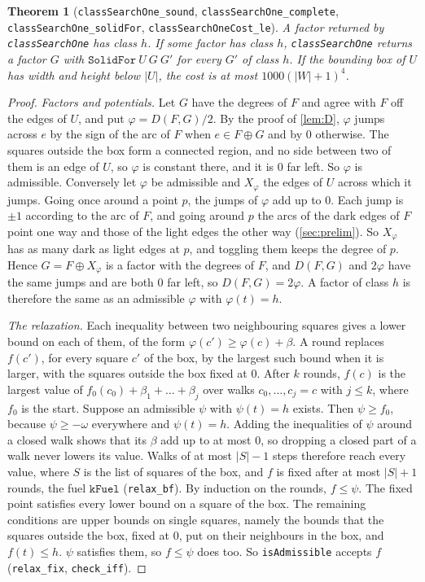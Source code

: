 \documentclass[11pt]{article}
\theoremstyle{plain}
\newtheorem{theorem}{Theorem}[section]
\theoremstyle{definition}
\theoremstyle{remark}
\newcommand{\lean}[1]{\texttt{#1}}
\begin{document}
\begin{theorem}[\lean{classSearchOne\_sound}, \lean{classSearchOne\_complete}, \lean{classSearchOne\_solidFor}, \lean{classSearchOneCost\_le}]
\label{thm:classsearch}
A factor returned by \lean{classSearchOne} has class $h$.
If some factor has class $h$, \lean{classSearchOne} returns a factor $G$ with $\lean{SolidFor}\ U\ G\ G'$ for
every $G'$ of class $h$.
If the bounding box of $U$ has width and height below $|U|$, the cost is at most
$1000(|W|+1)^4$.
\end{theorem}

\begin{proof}
\emph{Factors and potentials.}
Let $G$ have the degrees of $F$ and agree with $F$ off the edges of $U$, and put
$\varphi=D(F,G)/2$.
By the proof of \cref{lem:D}, $\varphi$ jumps across $e$ by the sign of the arc of $F$ when
$e\in F\oplus G$ and by $0$ otherwise.
The squares outside the box form a connected region, and no side between two of them is an edge of
$U$, so $\varphi$ is constant there, and it is $0$ far left.
So $\varphi$ is admissible.
Conversely let $\varphi$ be admissible and $X_\varphi$ the edges of $U$ across which it jumps.
Going once around a point $p$, the jumps of $\varphi$ add up to $0$.
Each jump is $\pm1$ according to the arc of $F$, and going around $p$ the arcs of the dark edges of
$F$ point one way and those of the light edges the other way (\cref{sec:prelim}).
So $X_\varphi$ has as many dark as light edges at $p$, and toggling them keeps the degree of $p$.
Hence $G=F\oplus X_\varphi$ is a factor with the degrees of $F$, and $D(F,G)$ and $2\varphi$ have
the same jumps and are both $0$ far left, so $D(F,G)=2\varphi$.
A factor of class $h$ is therefore the same as an admissible $\varphi$ with $\varphi(t)=h$.

\emph{The relaxation.}
Each inequality between two neighbouring squares gives a lower bound on each of them, of the form
$\varphi(c')\ge\varphi(c)+\beta$.
A round replaces $f(c')$, for every square $c'$ of the box, by the largest such bound when it is
larger, with the squares outside the box fixed at $0$.
After $k$ rounds, $f(c)$ is the largest value of $f_0(c_0)+\beta_1+\dots+\beta_j$ over walks
$c_0,\dots,c_j=c$ with $j\le k$, where $f_0$ is the start.
Suppose an admissible $\psi$ with $\psi(t)=h$ exists.
Then $\psi\ge f_0$, because $\psi\ge-\omega$ everywhere and $\psi(t)=h$.
Adding the inequalities of $\psi$ around a closed walk shows that its $\beta$ add up to at most $0$,
so dropping a closed part of a walk never lowers its value.
Walks of at most $|S|-1$ steps therefore reach every value, where $S$ is the list of squares of the
box, and $f$ is fixed after at most $|S|+1$ rounds, the fuel $\lean{kFuel}$ (\lean{relax\_bf}).
By induction on the rounds, $f\le\psi$.
The fixed point satisfies every lower bound on a square of the box.
The remaining conditions are upper bounds on single squares, namely the bounds that the squares
outside the box, fixed at $0$, put on their neighbours in the box, and $f(t)\le h$.
$\psi$ satisfies them, so $f\le\psi$ does too.
So \lean{isAdmissible} accepts $f$ (\lean{relax\_fix}, \lean{check\_iff}).


\end{proof}
\end{document}
